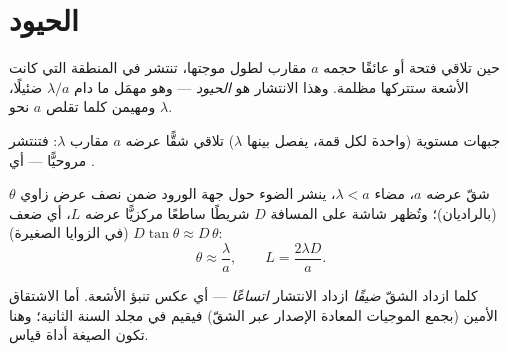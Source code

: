 \section{الحيود}

\begin{definition}[الحيود]\label{def:g12:light-as-wave:diffraction}
حين تلاقي  فتحة أو عائقًا حجمه $a$ مقارب
لطول موجتها، تنتشر في المنطقة التي كانت الأشعة ستتركها مظلمة.
وهذا الانتشار هو \emph{الحيود} --- وهو مهمَل
ما دام $\lambda/a$ ضئيلًا، ومهيمن كلما تقلص $a$ نحو $\lambda$.
\end{definition}

\begin{omfigure}

{\small جبهات  مستوية (واحدة لكل قمة، يفصل بينها $\lambda$) تلاقي شقًّا
عرضه $a$ مقارب  $\lambda$: فتنتشر  مروحيًّا --- أي .}
\end{omfigure}

\begin{proposition}\label{prop:g12:light-as-wave:halfwidth}
شقّ عرضه $a$، مضاء  $\lambda < a$، ينشر
الضوء حول جهة الورود ضمن نصف عرض زاوي
$\theta$ (بالراديان)؛ وتُظهر شاشة على المسافة $D$ شريطًا
ساطعًا مركزيًّا عرضه $L$، أي ضعف $D \tan\theta \approx D\,\theta$ (في الزوايا
الصغيرة):
\[
\theta \approx \frac{\lambda}{a}, \qquad L = \frac{2\lambda D}{a}.
\]
\end{proposition}
\admitted

\begin{remark}\label{rem:g12:light-as-wave:honest}
كلما ازداد الشقّ \emph{ضيقًا} ازداد الانتشار \emph{اتساعًا} --- أي
عكس تنبؤ الأشعة. أما الاشتقاق الأمين (بجمع الموجيات
المعادة الإصدار عبر الشقّ) فيقيم في مجلد السنة الثانية؛ وهنا
تكون الصيغة أداة قياس.
\end{remark}

